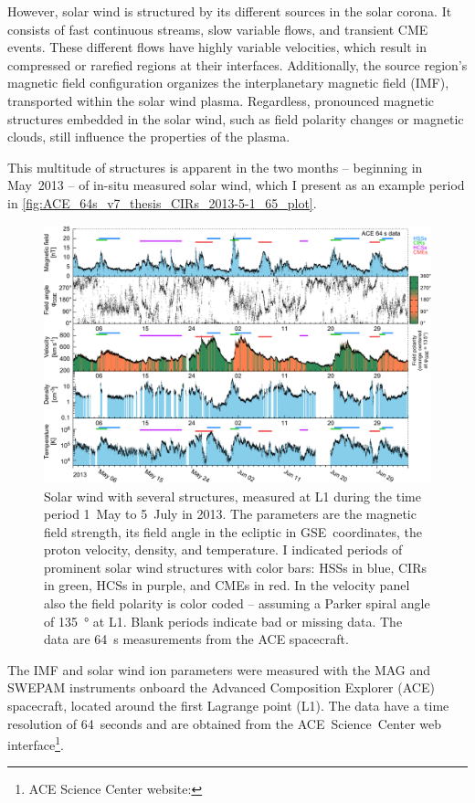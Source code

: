 However, solar wind is structured by its different sources in the solar corona. It consists of fast continuous streams, slow variable flows, and transient CME events. These different flows have highly variable velocities, which result in compressed or rarefied regions at their interfaces. Additionally, the source region's magnetic field configuration organizes the interplanetary magnetic field (IMF), transported within the solar wind plasma. Regardless, pronounced magnetic structures embedded in the solar wind, such as field polarity changes or magnetic clouds, still influence the properties of the plasma.

This multitude of structures is apparent in the two months -- beginning in May~2013 -- of in-situ measured solar wind, which I present as an example period in \autoref{fig:ACE_64s_v7_thesis_CIRs_2013-5-1_65_plot}.
\begin{figure}[htb]
	\centering
	\includegraphics[width=\textwidth]{figures_of_mine/gnuplots/ACE_64s_v7_thesis_CIRs_2013-5-1_65_plot.pdf}
	\caption[]
	{Solar wind with several structures, measured at L1 during the time period 1~May to 5~July in 2013. The parameters are the magnetic field strength, its field angle in the ecliptic in GSE~coordinates, the proton velocity, density, and temperature. I indicated periods of prominent solar wind structures with color bars: HSSs in blue, CIRs in green, HCSs in purple, and CMEs in red. In the velocity panel also the field polarity is color coded -- assuming a Parker spiral angle of \SI{135}{\degree} at L1. Blank periods indicate bad or missing data. The data are 64~s measurements from the ACE spacecraft.}
	\label{fig:ACE_64s_v7_thesis_CIRs_2013-5-1_65_plot}
\end{figure}
The IMF and solar wind ion parameters were measured with the MAG and SWEPAM instruments onboard the Advanced Composition Explorer (ACE) spacecraft, located around the first Lagrange point (L1). The data have a time resolution of 64~seconds and are obtained from the ACE~Science~Center web interface\footnote{ACE Science Center website: }.

